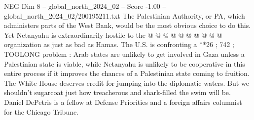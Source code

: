 \begin{textsample}{NEG Dim 8 – global\_north\_2024\_02 – Score -1.00 – global\_north\_2024\_02/200195211.txt}
The Palestinian Authority, or PA, which administers parts of the West Bank, would be the most obvious choice to do this.
Yet Netanyahu is extraordinarily hostile to the @ @ @ @ @ @ @ @ @ @ organization as just as bad as Hamas.
The U.S. is confronting a **26 ; 742 ; TOOLONG problem : Arab states are unlikely to get involved in Gaza unless a Palestinian state is viable, while Netanyahu is unlikely to be cooperative in this entire process if it improves the chances of a Palestinian state coming to fruition.
The White House deserves credit for jumping into the diplomatic waters.
But we shouldn't sugarcoat just how treacherous and shark-filled the swim will be.
Daniel DePetris is a fellow at Defense Priorities and a foreign affairs columnist for the Chicago Tribune.

\end{textsample}
